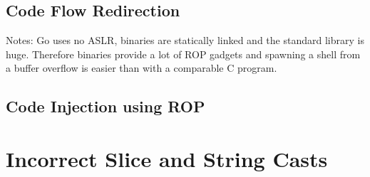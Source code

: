 \subsection{Code Flow Redirection}\label{subsec:unsafe-security-problems:buffer-overflow:code-flow-redirection}

Notes: Go uses no \acrshort{ASLR}, binaries are statically linked and the standard library is huge.
Therefore binaries provide a lot of ROP gadgets and spawning a shell from a buffer overflow is easier than with a
comparable C program.



\subsection{Code Injection using ROP}\label{subsec:unsafe-security-problems:buffer-overflow:code-injection}






\section{Incorrect Slice and String Casts}\label{sec:unsafe-security-problems:slice-casts}

